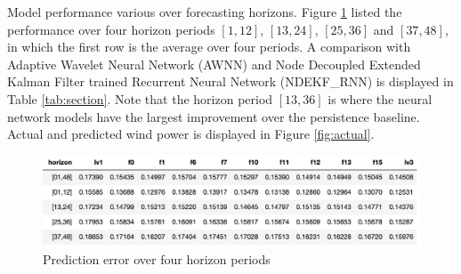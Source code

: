 \documentclass[conference]{IEEEtran}
\begin{document}
Model performance various over forecasting horizons. Figure \ref{fig:section} listed the performance over four horizon periods $[1,12]$, $[13,24]$, $[25,36]$ and $[37,48]$, in which the first row is the average over four periods. A comparison with Adaptive Wavelet Neural Network (AWNN) \cite{7894735} and Node Decoupled Extended Kalman Filter trained Recurrent Neural Network (NDEKF\_RNN) \cite{Kanna13} is displayed in Table \ref{tab:section}. Note that the horizon period $[13,36]$ is where the neural network models have the largest improvement over the persistence baseline. Actual and predicted wind power is displayed in Figure \ref{fig:actual}. 

\begin{figure}
\centering
\includegraphics[width=0.9\columnwidth]{FIG/section}
\caption{Prediction error over four horizon periods}
\label{fig:section}
\vspace*{-3mm}
\end{figure}

\begin{table}[h]
\caption {Prediction error over horizon period $[13,36]$}
\begin{center}
\label{tab:section}
\end{center}
\vspace*{-1mm}
\end{table}
\end{document}
